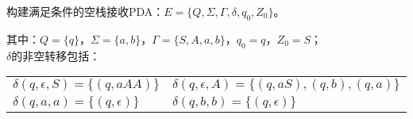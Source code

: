 \begin{solution}
    构建满足条件的空栈接收PDA：$E=\{Q,\Sigma,\Gamma,\delta,q_0,Z_0\}$。

    其中：$Q=\{q\}$，$\Sigma=\{a,b\}$，$\Gamma=\{S,A,a,b\}$，$q_0 = q$，$Z_0=S$；\\
    $\delta$的非空转移包括：\\
    \begin{tabular}{ll}
        $\delta(q,\epsilon,S) = \{(q,aAA)\}$
        &$\delta(q,\epsilon,A) = \{(q,aS),(q,b),(q,a)\}$\\
        $\delta(q,a,a) = \{(q,\epsilon)\}$
        &$\delta(q,b,b) = \{(q,\epsilon)\}$
    \end{tabular}
\end{solution}
